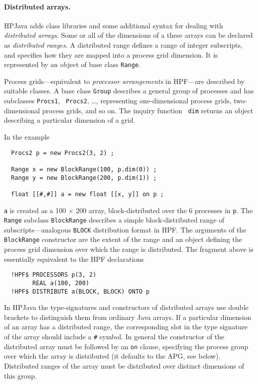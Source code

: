 \paragraph{Distributed arrays.}

HPJava adds class libraries and some additional syntax for dealing
with {\em distributed arrays}.
Some or all of the dimensions of a these arrays can be
declared as {\em distributed ranges}.  
A distributed range defines a range of integer subscripts,
and specifies how they are mapped into a process grid dimension.
It is represented by an object of base class {\tt Range}.

Process grids---equivalent to {\em processor arrangements} in HPF---are
described by suitable classes.  A base class {\tt Group} describes a
general group of processes and has subclasses {\tt Procs1}, {\tt
Procs2}, \ldots, representing one-dimensional process grids,
two-dimen\-sional process grids, and so on.  The inquiry function {\tt
dim} returns an object describing a particular dimension of a grid.

In the example
\small
\begin{verbatim}
  Procs2 p = new Procs2(3, 2) ;

  Range x = new BlockRange(100, p.dim(0)) ;
  Range y = new BlockRange(200, p.dim(1)) ;

  float [[#,#]] a = new float [[x, y]] on p ;
\end{verbatim}
\normalsize
{\tt a} is created as a 100 $\times$ 200 array,
block-distributed over the 6 processes in {\tt p}.
The {\tt Range} subclass {\tt BlockRange} describes a simple
block-distributed range of subscripts---analogous {\tt BLOCK}
distribution format in HPF.  The arguments of the {\tt BlockRange}
constructor are the extent of the range and an object
defining the process grid dimension over which the range is
distributed.  The fragment above is
essentially equivalent to the HPF declarations
\small
\begin{verbatim}
  !HPF$ PROCESSORS p(3, 2)
        REAL a(100, 200)
  !HPF$ DISTRIBUTE a(BLOCK, BLOCK) ONTO p
\end{verbatim}
\normalsize
In HPJava the type-signatures and constructors of distributed
arrays use double brackets to distinguish them from ordinary
Java arrays.  If a particular dimension of an array has a distributed
range, the corresponding slot in the type signature of the array should
include a {\tt \#} symbol.  In general the constructor of the
distributed array must be followed by an {\tt on} clause, specifying
the process group over which the array is distributed (it defaults to
the APG, see below).  Distributed ranges of the array must be
distributed over distinct dimensions of this group.


